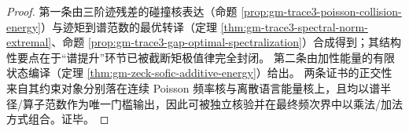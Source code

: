 \begin{proof}
第一条由三阶迹残差的碰撞核表达（命题 \ref{prop:gm-trace3-poisson-collision-energy}）与迹矩到谱范数的最优转译（定理 \ref{thm:gm-trace3-spectral-norm-extremal}、命题 \ref{prop:gm-trace3-gap-optimal-spectralization}）合成得到；其结构性要点在于“谱提升”环节已被截断矩极值律完全封闭。
第二条由加性能量的有限状态编译（定理 \ref{thm:gm-zeck-sofic-additive-energy}）给出。
两条证书的正交性来自其约束对象分别落在连续 Poisson 频率核与离散语言能量核上，且均以谱半径/算子范数作为唯一门槛输出，因此可被独立核验并在最终频次界中以乘法/加法方式组合。证毕。
\end{proof}

\endinput
